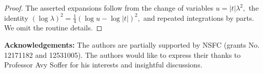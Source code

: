 \documentclass[reqno]{amsart}
\newcommand{\cqd}{\hfill$\Box$}
\numberwithin{equation}{section}
\begin{document}

\begin{proof}
The asserted expansions follow from the change of variables
$
u=|t|\lambda^2,
$
the identity
$
(\log\lambda)^2
=
\frac14(\log u-\log|t|)^2,
$
and repeated integrations by parts. We omit the
routine details.
\end{proof}







{\bf Acknowledgements:} The authors are partially supported by NSFC (grants No. 12171182 and 12531005). The authors would like to express their thanks to Professor Avy Soffer for his interests and insightful discussions.
\end{document}
